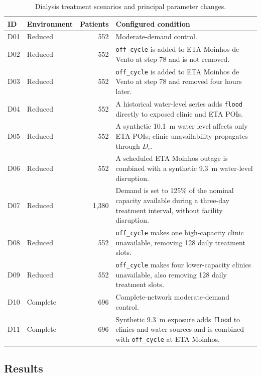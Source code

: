 \begin{table}[ht]
\centering
\footnotesize
\caption{Dialysis treatment scenarios and principal parameter changes.}
\label{tbl:dialysis_scenarios}
\begin{tabularx}{\linewidth}{@{}llrX@{}}
\toprule
\textbf{ID} & \textbf{Environment} &
\textbf{Patients} & \textbf{Configured condition} \\ \midrule
D01 & Reduced  & 552  & Moderate-demand control. \\ \midrule
D02 & Reduced  & 552  & \texttt{off\_cycle} is added to ETA Moinhos de Vento at step 78 and is not removed. \\ \midrule
D03 & Reduced  & 552  & \texttt{off\_cycle} is added to ETA Moinhos de Vento at step 78 and removed four hours later. \\ \midrule
D04 & Reduced  & 552  & A historical water-level series adds \texttt{flood} directly to exposed clinic and ETA POIs. \\ \midrule
D05 & Reduced  & 552  & A synthetic 10.1~m water level affects only ETA POIs; clinic unavailability propagates through $D_i$. \\ \midrule
D06 & Reduced  & 552  & A scheduled ETA Moinhos outage is combined with a synthetic 9.3~m water-level disruption. \\ \midrule
D07 & Reduced  & 1,380 & Demand is set to 125\% of the nominal capacity available during a three-day treatment interval, without facility disruption. \\ \midrule
D08 & Reduced  & 552  & \texttt{off\_cycle} makes one high-capacity clinic unavailable, removing 128 daily treatment slots. \\ \midrule
D09 & Reduced  & 552  & \texttt{off\_cycle} makes four lower-capacity clinics unavailable, also removing 128 daily treatment slots. \\ \midrule
D10 & Complete & 696  & Complete-network moderate-demand control. \\ \midrule
D11 & Complete & 696  & Synthetic 9.3~m exposure adds \texttt{flood} to clinics and water sources and is combined with \texttt{off\_cycle} at ETA Moinhos. \\ \bottomrule
\end{tabularx}
\end{table}

\subsection{Results}
\label{sec:dialysis_results}

